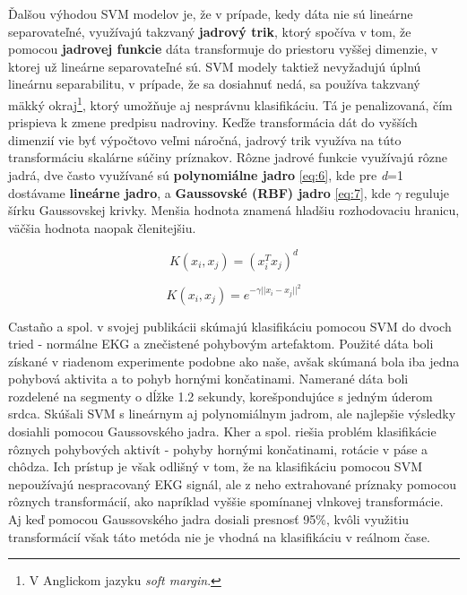 Ďalšou výhodou SVM modelov je, že v prípade, kedy dáta nie sú lineárne separovateľné, využívajú takzvaný \textbf{jadrový trik}, ktorý spočíva v tom, že pomocou \textbf{jadrovej funkcie} dáta transformuje do priestoru vyššej dimenzie, v ktorej už lineárne separovateľné sú. SVM modely taktiež nevyžadujú úplnú lineárnu separabilitu, v prípade, že sa dosiahnuť nedá, sa používa takzvaný mäkký okraj\footnote{V Anglickom jazyku \textit{soft margin}.}, ktorý umožňuje aj nesprávnu klasifikáciu. Tá je penalizovaná, čím prispieva k zmene predpisu nadroviny. Keďže transformácia dát do vyšších dimenzií vie byť výpočtovo veľmi náročná, jadrový trik využíva na túto transformáciu skalárne súčiny príznakov. Rôzne jadrové funkcie využívajú rôzne jadrá, dve často využívané sú \textbf{polynomiálne jadro} \ref{eq:6}, kde pre \textit{d}=1 dostávame \textbf{lineárne jadro}, a \textbf{Gaussovské (RBF) jadro} \ref{eq:7}, kde \textit{\( \gamma \)} reguluje šírku Gaussovskej krivky. Menšia hodnota znamená hladšiu rozhodovaciu hranicu, väčšia hodnota naopak členitejšiu.\cite{Cristianini_Scholkopf_2002}\cite{Suthaharan2016}

\vspace{5pt}
\noindent
\begin{minipage}[t]{.45\textwidth}
    \begin{equation} 
        \label{eq:6}
        K(x_i,x_j) = (x_i^{T} x_j)^{d}
    \end{equation}
\end{minipage}
\hfill
\begin{minipage}[t]{.45\textwidth}
    \begin{equation} 
        \label{eq:7}
        K(x_i,x_j) = {e^{-\gamma ||x_i - x_j||^{2}}}
    \end{equation}
\end{minipage}
\vspace{5pt}

Castaño a spol.\cite{Castao2017} v svojej publikácii skúmajú klasifikáciu pomocou SVM do dvoch tried - normálne EKG a znečistené pohybovým artefaktom. Použité dáta boli získané v riadenom experimente podobne ako naše, avšak skúmaná bola iba jedna pohybová aktivita a to pohyb hornými končatinami. Namerané dáta boli rozdelené na segmenty o dĺžke 1.2 sekundy, korešpondujúce s jedným úderom srdca. Skúšali SVM s lineárnym aj polynomiálnym jadrom, ale najlepšie výsledky dosiahli pomocou Gaussovského jadra. Kher a spol.\cite{Kher2015} riešia problém klasifikácie rôznych pohybových aktivít - pohyby hornými končatinami, rotácie v páse a chôdza. Ich prístup je však odlišný v tom, že na klasifikáciu pomocou SVM nepoužívajú nespracovaný EKG signál, ale z neho extrahované príznaky pomocou rôznych transformácií, ako napríklad vyššie spomínanej vlnkovej transformácie. Aj keď pomocou Gaussovského jadra dosiali presnosť 95\%, kvôli využitiu transformácií však táto metóda nie je vhodná na klasifikáciu v reálnom čase.



